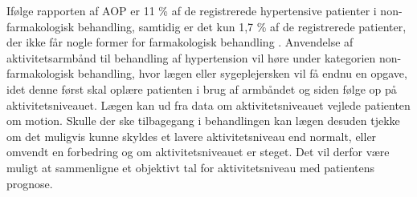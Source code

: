 Ifølge rapporten af AOP er 11 \% af de registrerede hypertensive patienter i non-farmakologisk behandling, samtidig er det kun 1,7 \% af de registrerede patienter, der ikke får nogle former for farmakologisk behandling \citep{munck2007}.
Anvendelse af aktivitetsarmbånd til behandling af hypertension vil høre under kategorien non-farmakologisk behandling, hvor lægen eller sygeplejersken vil få endnu en opgave, idet denne først skal oplære patienten i brug af armbåndet og siden følge op på aktivitetsniveauet. Lægen kan ud fra data om aktivitetsniveauet vejlede patienten om motion. Skulle der ske tilbagegang i behandlingen kan lægen desuden tjekke om det muligvis kunne skyldes et lavere aktivitetsniveau end normalt, eller omvendt en forbedring og om aktivitetsniveauet er steget. Det vil derfor være muligt at sammenligne et objektivt tal for aktivitetsniveau med patientens prognose. 

